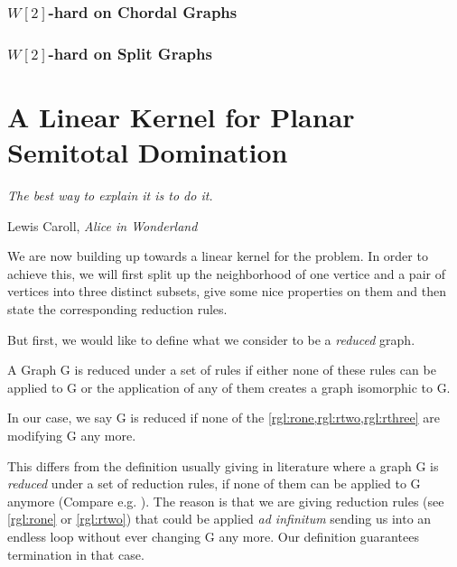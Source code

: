 

\subsection{\hmath $W[2]$-hard on Chordal Graphs}

\subsection{\hmath $W[2]$-hard on Split Graphs}

\chapter{A Linear Kernel for Planar Semitotal Domination}

\epigraph{\itshape The best way to explain it is to do it.}{Lewis Caroll, \textit{Alice in Wonderland}}

We are now building up towards a linear kernel for the \sdom problem. In order to achieve this, we will first split up the neighborhood of one vertice and a pair of vertices into three distinct subsets, give some nice properties on them and then state the corresponding reduction rules.  



But first, we would like to define what we consider to be a \textit{reduced} graph. 

\begin{definition}
    A Graph G is reduced under a set of rules if either none of these rules can be applied to G or the application of any of them creates a graph isomorphic to G.
\end{definition}\label{def:reduced}

In our case, we say G is reduced if none of the \cref{rgl:rone,rgl:rtwo,rgl:rthree} are modifying G any more.

This differs from the definition usually giving in literature where a graph G is \textit{reduced} under a set of reduction rules, if none of them can be applied to G anymore (Compare e.g. \cite{Fomin2019}). The reason is that we are giving reduction rules (see \cref{rgl:rone} or \cref{rgl:rtwo}) that could be applied \textit{ad infinitum} sending us into an endless loop without ever changing G any more. Our definition guarantees termination in that case.

